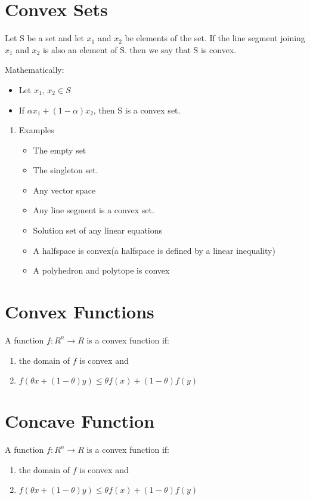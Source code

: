 \documentclass[11pt]{report}
\begin{document}
\section{Convex Sets}
\label{sec:orgab68688}
Let S be a set and let \(x_1\) and \(x_2\) be elements of the set. If the line segment joining \(x_1\) and \(x_2\) is also an element of S. then we say that S is convex.

Mathematically:
\begin{itemize}
\item Let \(x_1\), \(x_2 \in S\)
\item If \(\alpha x_1 + (1 - \alpha) x_{2}\), then S is a convex set.
\end{itemize}
\begin{enumerate}
\item Examples
\label{sec:org8218b5c}
\begin{itemize}
\item The empty set
\item The singleton set.
\item Any vector space
\item Any line segment is a convex set.
\item Solution set of any linear equations
\item A halfspace is convex(a halfspace is defined by a linear inequality)
\item A polyhedron and polytope is convex
\end{itemize}
\end{enumerate}
\section{Convex Functions}
\label{sec:org58ee57b}
A function \(f: R^n \rightarrow R\) is a convex function if:
\begin{enumerate}
\item the domain of \(f\) is convex and
\item \(f(\theta x + (1 - \theta)y) \le \theta f(x) + (1- \theta) f(y)\)
\end{enumerate}
\section{Concave Function}
\label{sec:orgbc5c6e3}
A function \(f: R^n \rightarrow R\) is a convex function if:
\begin{enumerate}
\item the domain of \(f\) is convex and
\item \(f(\theta x + (1 - \theta)y) \le \theta f(x) + (1- \theta) f(y)\)
\end{enumerate}
\end{document}
